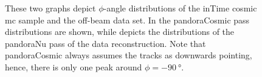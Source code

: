 \begin{figure}[htbp]
    \centering
    \caption[Cosmic-Ray Reconstruction $\phi$-Angle Distributions]{These two graphs depict $\phi$-angle distributions of the inTime cosmic \gls{mc} sample and the off-beam data set. In  the pandoraCosmic pass distributions are shown, while  depicts the distributions of the pandoraNu pass of the data reconstruction. Note that pandoraCosmic always assumes the tracks as downwards pointing, hence, there is only one peak around $\phi = \SI{-90}{\degree}$.}
    \label{fig:CosmicRecoPhi}
\end{figure}
